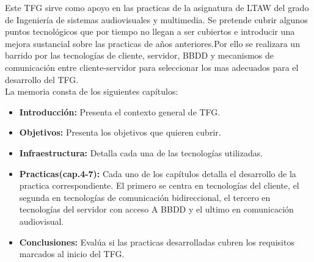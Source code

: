 \documentclass[oneside,a4paper,11pt]{book}
\begin{document}
Este TFG sirve  como apoyo en las practicas de la asignatura de LTAW del grado de Ingeniería de sistemas audiovisuales y multimedia. Se pretende cubrir algunos puntos tecnológicos que por tiempo no llegan a ser cubiertos e introducir una mejora sustancial sobre las practicas de años anteriores.Por ello se realizara un barrido por las tecnologías de cliente, servidor, BBDD y mecanismos de comunicación entre cliente-servidor para seleccionar los mas adecuados para el desarrollo del TFG.
\\La memoria consta de los siguientes capítulos:
\begin{itemize}
\item \textbf{Introducción:} Presenta el contexto general de TFG.
\item\textbf{ Objetivos:} Presenta los objetivos que quieren cubrir.
\item \textbf{Infraestructura:} Detalla cada una de las tecnologías utilizadas.
\item\textbf{Practicas(cap.4-7):} Cada uno de los capítulos detalla el desarrollo de la practica correspondiente. El primero se centra en tecnologías del cliente, el segunda en tecnologías de comunicación bidireccional, el tercero en tecnologías del servidor con acceso A BBDD y el ultimo en comunicación audiovisual.
\item \textbf{Conclusiones:} Evalúa si las practicas desarrolladas cubren los requisitos marcados al inicio del TFG.
\end{itemize}

\tableofcontents %

\listoffigures %


\mainmatter %
\pagestyle{headings}


%




 
 

 
% 
%
\thispagestyle{empty}

\thispagestyle{empty}
\end{document}
